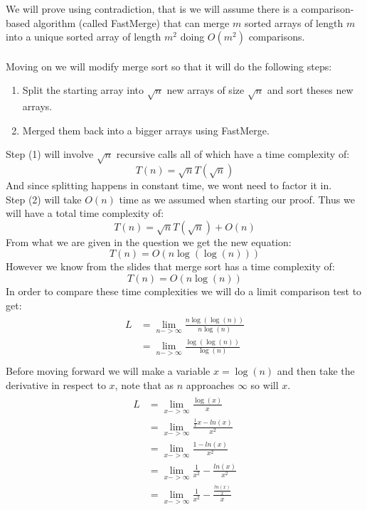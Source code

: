 \documentclass[12pt]{article}
\begin{document}
\begin{adjustwidth}{0em}{0pt}
We will prove using contradiction, that is we will assume there is a comparison-based algorithm (called FastMerge) that can merge $m$ sorted arrays of length $m$ into a unique sorted array of length $m^2$ doing $O(m^2)$ comparisons. \\ \\ Moving on we will modify merge sort so that it will do the following steps:
\begin{enumerate}
  \item Split the starting array into $\sqrt{n}$ new arrays of size $\sqrt{n}$ and sort theses new arrays.
  \item Merged them back into a bigger arrays using FastMerge.
\end{enumerate} Step (1) will involve $\sqrt{n}$ recursive calls all of which have a time complexity of:
\[ T(n) = \sqrt{n}T(\sqrt{n}) \]
And since splitting happens in constant time, we wont need to factor it in.\\
Step (2) will take $O(n)$ time as we assumed when starting our proof. Thus we will have a total time complexity of:
\[ T(n) = \sqrt{n}T(\sqrt{n}) + O(n) \]
From what we are given in the question we get the new equation:
\[ T(n) = O(n \log(\log(n))) \]
However we know from the slides that merge sort has a time complexity of:
\[ T(n) = O(n \log(n)) \]
In order to compare these time complexities we will do a limit comparison test to get:
\begin{align*}
    \begin{aligned}
       L &= \lim_{n->\infty}\frac{n \log(\log(n))}{n \log(n)}  \\
       &= \lim_{n->\infty}\frac{\log(\log(n))}{\log(n)} \\
    \end{aligned}
\end{align*}
Before moving forward we will make a variable $x=\log(n)$ and then take the derivative in respect to $x$, note that as $n$ approaches $\infty$ so will $x$.
\begin{align*}
    \begin{aligned}
       L &= \lim_{x->\infty}\frac{\log(x)}{x}  \\
       &= \lim_{x->\infty}\frac{\frac{1}{x}x - ln(x)}{x^2} \\
       &= \lim_{x->\infty}\frac{1 - ln(x)}{x^2} \\
       &= \lim_{x->\infty}\frac{1}{x^2} - \frac{ln(x)}{x^2}  \\
       &= \lim_{x->\infty}\frac{1}{x^2} - \frac{\frac{ln(x)}{x}}{x}  \\

\end{aligned}
\end{align*}
\end{adjustwidth}
\end{document}
